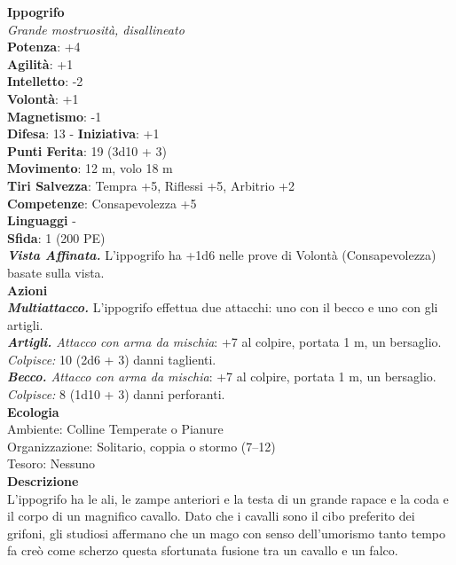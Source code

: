 \begin{multicols}{2}
\medskip\textbf{Ippogrifo}\\
\emph{Grande mostruosità, disallineato}\\
\textbf{Potenza}: +4\\
\textbf{Agilità}: +1\\
\textbf{Intelletto}: -2\\
\textbf{Volontà}: +1\\
\textbf{Magnetismo}: -1\\
\textbf{Difesa}: 13 - \textbf{Iniziativa}: +1\\
\textbf{Punti Ferita}: 19 (3d10 + 3)\\
\textbf{Movimento}: 12 m, volo 18 m\\
\textbf{Tiri Salvezza}: Tempra +5, Riflessi +5, Arbitrio +2\\
\textbf{Competenze}: Consapevolezza +5\\
\textbf{Linguaggi} -\\
\textbf{Sfida}: 1 (200 PE)\smallskip\\
\emph{\textbf{Vista Affinata.}} L'ippogrifo ha +1d6 nelle prove di Volontà (Consapevolezza) basate sulla vista.\\
\smallskip\textbf{Azioni}\\
\emph{\textbf{Multiattacco.}} L'ippogrifo effettua due attacchi: uno con il becco e uno con gli artigli.\\
\emph{\textbf{Artigli.} Attacco con arma da mischia}: +7 al colpire, portata 1 m, un bersaglio.\\
\emph{Colpisce:} 10 (2d6 + 3) danni taglienti.\\
\emph{\textbf{Becco.} Attacco con arma da mischia}: +7 al colpire, portata 1 m, un bersaglio.\\
\emph{Colpisce:} 8 (1d10 + 3) danni perforanti. \\
\textbf{Ecologia}\\
Ambiente: Colline Temperate o Pianure\\
Organizzazione: Solitario, coppia o stormo (7–12)\\
Tesoro: Nessuno\\
\textbf{Descrizione}\\
L’ippogrifo ha le ali, le zampe anteriori e la testa di un grande rapace e la coda e il corpo di un magnifico cavallo. Dato che i cavalli sono il cibo preferito dei grifoni, gli studiosi affermano che un mago con senso dell’umorismo tanto tempo fa creò come scherzo questa sfortunata fusione tra un cavallo e un falco.\\


\end{multicols}
